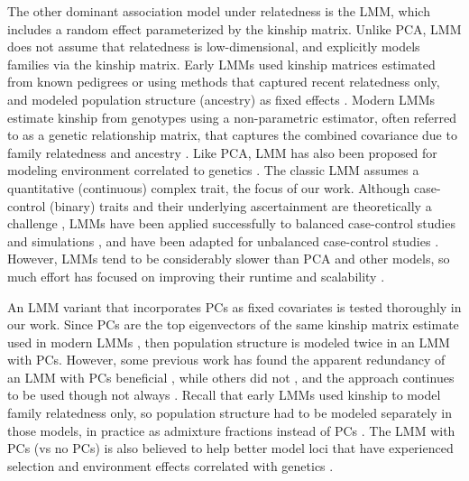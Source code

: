 \documentclass[9pt,lineno]{elife}
\begin{document}
The other dominant association model under relatedness is the LMM, which includes a random effect parameterized by the kinship matrix.
Unlike PCA, LMM does not assume that relatedness is low-dimensional, and explicitly models families via the kinship matrix.
Early LMMs used kinship matrices estimated from known pedigrees or using methods that captured recent relatedness only, and modeled population structure (ancestry) as fixed effects \citep{yu_unified_2006, zhao_arabidopsis_2007, zhu_nonmetric_2009}.
Modern LMMs estimate kinship from genotypes using a non-parametric estimator, often referred to as a genetic relationship matrix, that captures the combined covariance due to family relatedness and ancestry \citep{kang_efficient_2008, astle_population_2009, ochoa_estimating_2021}.
Like PCA, LMM has also been proposed for modeling environment correlated to genetics \citep{vilhjalmsson_nature_2013, wang_trade-offs_2022}.
The classic LMM assumes a quantitative (continuous) complex trait, the focus of our work.
Although case-control (binary) traits and their underlying ascertainment are theoretically a challenge \citep{yang_advantages_2014}, LMMs have been applied successfully to balanced case-control studies \citep{astle_population_2009, kang_variance_2010} and simulations \citep{price_new_2010, wu_comparison_2011, sul_mixed_2013}, and have been adapted for unbalanced case-control studies \citep{zhou_efficiently_2018}.
However, LMMs tend to be considerably slower than PCA and other models, so much effort has focused on improving their runtime and scalability \citep{aulchenko_genomewide_2007, kang_efficient_2008, kang_variance_2010, zhang_mixed_2010, lippert_fast_2011, yang_gcta:_2011, listgarten_improved_2012, zhou_genome-wide_2012, svishcheva_rapid_2012, loh_efficient_2015, zhou_efficiently_2018}.

An LMM variant that incorporates PCs as fixed covariates is tested thoroughly in our work.
Since PCs are the top eigenvectors of the same kinship matrix estimate used in modern LMMs \citep{astle_population_2009, janss_inferences_2012, hoffman_correcting_2013, zhang_principal_2015}, then population structure is modeled twice in an LMM with PCs.
However, some previous work has found the apparent redundancy of an LMM with PCs beneficial \citep{price_new_2010, tucker_improving_2014, zhang_principal_2015}, while others did not \citep{liu_controlling_2011, janss_inferences_2012}, and the approach continues to be used \citep{zeng_signatures_2018, mbatchou_computationally_2021} though not always \citep{matoba_gwas_2020}.
Recall that early LMMs used kinship to model family relatedness only, so population structure had to be modeled separately in those models, in practice as admixture fractions instead of PCs \citep{yu_unified_2006, zhao_arabidopsis_2007, zhu_nonmetric_2009}.
The LMM with PCs (vs no PCs) is also believed to help better model loci that have experienced selection \citep{price_new_2010, vilhjalmsson_nature_2013} and environment effects correlated with genetics \citep{zhang_principal_2015}.
\end{document}
